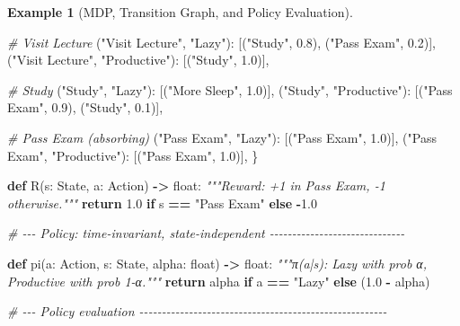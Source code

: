 \documentclass[
]{book}
\newenvironment{Shaded}{\begin{snugshade}}{\end{snugshade}}
\newcommand{\BuiltInTok}[1]{#1}
\newcommand{\CommentTok}[1]{\textcolor[rgb]{0.56,0.35,0.01}{\textit{#1}}}
\newcommand{\ControlFlowTok}[1]{\textcolor[rgb]{0.13,0.29,0.53}{\textbf{#1}}}
\newcommand{\FloatTok}[1]{\textcolor[rgb]{0.00,0.00,0.81}{#1}}
\newcommand{\KeywordTok}[1]{\textcolor[rgb]{0.13,0.29,0.53}{\textbf{#1}}}
\newcommand{\NormalTok}[1]{#1}
\newcommand{\OperatorTok}[1]{\textcolor[rgb]{0.81,0.36,0.00}{\textbf{#1}}}
\newcommand{\StringTok}[1]{\textcolor[rgb]{0.31,0.60,0.02}{#1}}
\theoremstyle{definition}
\theoremstyle{definition}
\newtheorem{example}{Example}[chapter]
\theoremstyle{definition}
\theoremstyle{definition}
\theoremstyle{remark}
\begin{document}
\begin{example}[MDP, Transition Graph, and Policy Evaluation]
\begin{Shaded}
\begin{Highlighting}[]
    \CommentTok{\# Visit Lecture}
\NormalTok{    (}\StringTok{"Visit Lecture"}\NormalTok{, }\StringTok{"Lazy"}\NormalTok{):       [(}\StringTok{"Study"}\NormalTok{, }\FloatTok{0.8}\NormalTok{), (}\StringTok{"Pass Exam"}\NormalTok{, }\FloatTok{0.2}\NormalTok{)],}
\NormalTok{    (}\StringTok{"Visit Lecture"}\NormalTok{, }\StringTok{"Productive"}\NormalTok{): [(}\StringTok{"Study"}\NormalTok{, }\FloatTok{1.0}\NormalTok{)],}

    \CommentTok{\# Study}
\NormalTok{    (}\StringTok{"Study"}\NormalTok{, }\StringTok{"Lazy"}\NormalTok{):         [(}\StringTok{"More Sleep"}\NormalTok{, }\FloatTok{1.0}\NormalTok{)],}
\NormalTok{    (}\StringTok{"Study"}\NormalTok{, }\StringTok{"Productive"}\NormalTok{):   [(}\StringTok{"Pass Exam"}\NormalTok{, }\FloatTok{0.9}\NormalTok{), (}\StringTok{"Study"}\NormalTok{, }\FloatTok{0.1}\NormalTok{)],}

    \CommentTok{\# Pass Exam (absorbing)}
\NormalTok{    (}\StringTok{"Pass Exam"}\NormalTok{, }\StringTok{"Lazy"}\NormalTok{):       [(}\StringTok{"Pass Exam"}\NormalTok{, }\FloatTok{1.0}\NormalTok{)],}
\NormalTok{    (}\StringTok{"Pass Exam"}\NormalTok{, }\StringTok{"Productive"}\NormalTok{): [(}\StringTok{"Pass Exam"}\NormalTok{, }\FloatTok{1.0}\NormalTok{)],}
\NormalTok{\}}

\KeywordTok{def}\NormalTok{ R(s: State, a: Action) }\OperatorTok{{-}\textgreater{}} \BuiltInTok{float}\NormalTok{:}
    \CommentTok{"""Reward: +1 in Pass Exam, {-}1 otherwise."""}
    \ControlFlowTok{return} \FloatTok{1.0} \ControlFlowTok{if}\NormalTok{ s }\OperatorTok{==} \StringTok{"Pass Exam"} \ControlFlowTok{else} \OperatorTok{{-}}\FloatTok{1.0}

\CommentTok{\# {-}{-}{-} Policy: time{-}invariant, state{-}independent {-}{-}{-}{-}{-}{-}{-}{-}{-}{-}{-}{-}{-}{-}{-}{-}{-}{-}{-}{-}{-}{-}{-}{-}{-}{-}{-}{-}{-}{-}}

\KeywordTok{def}\NormalTok{ pi(a: Action, s: State, alpha: }\BuiltInTok{float}\NormalTok{) }\OperatorTok{{-}\textgreater{}} \BuiltInTok{float}\NormalTok{:}
    \CommentTok{"""π(a|s): Lazy with prob α, Productive with prob 1{-}α."""}
    \ControlFlowTok{return}\NormalTok{ alpha }\ControlFlowTok{if}\NormalTok{ a }\OperatorTok{==} \StringTok{"Lazy"} \ControlFlowTok{else}\NormalTok{ (}\FloatTok{1.0} \OperatorTok{{-}}\NormalTok{ alpha)}

\CommentTok{\# {-}{-}{-} Policy evaluation {-}{-}{-}{-}{-}{-}{-}{-}{-}{-}{-}{-}{-}{-}{-}{-}{-}{-}{-}{-}{-}{-}{-}{-}{-}{-}{-}{-}{-}{-}{-}{-}{-}{-}{-}{-}{-}{-}{-}{-}{-}{-}{-}{-}{-}{-}{-}{-}{-}{-}{-}{-}{-}{-}{-}}


\end{Highlighting}
\end{Shaded}
\end{example}
\end{document}
